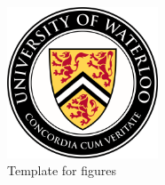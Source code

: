 \begin{figure}
    \centering
    \includegraphics[width=0.4\textwidth]{assets/uw.png}
    \caption{Template for figures}
    \label{fig:template}
\end{figure}